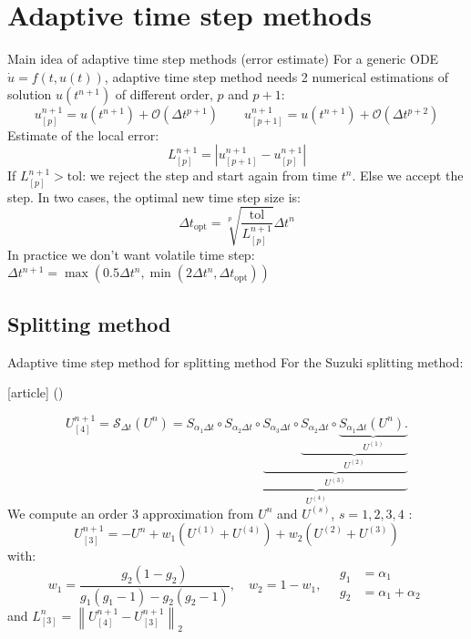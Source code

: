 \documentclass{beamer}
\newcommand{\customcite}[1]{\citeauthor{#1} (\citeyear{#1})}
\begin{document}
\section{Adaptive time step methods}
\begin{frame}{Main idea of adaptive time step methods (error estimate)}
  For a generic ODE $\dot{u} = f(t,u(t))$, adaptive time step method needs 2 numerical estimations of solution $u(t^{n+1})$ of different order, $p$ and $p+1$:
  $$
    u^{n+1}_{[p]} = u(t^{n+1}) + \mathcal{O}\left(\Delta t^{p+1}\right)
    \qquad
    u^{n+1}_{[p+1]} = u(t^{n+1}) + \mathcal{O}\left(\Delta t^{p+2}\right)
  $$
  Estimate of the local error:
  $$
    L^{n+1}_{[p]} = \left| u^{n+1}_{[p+1]} - u^{n+1}_{[p]} \right|
  $$
  If $L^{n+1}_{[p]} > \text{tol}$: we reject the step and  start again from time $t^n$. Else we accept the step. In two cases, the optimal new time step size is:
  $$
    \Delta t_\text{opt} = \sqrt[p]{\frac{\text{tol}}{ L^{n+1}_{[p]}}}\Delta t^n
  $$
  In practice we don't want volatile time step: $\Delta t^{n+1} = \max\left(0.5\Delta t^n,\min\left(2\Delta t^n,\Delta t_\text{opt}\right)\right)$
\end{frame}

\subsection{Splitting method}
\begin{frame}{Adaptive time step method for splitting method}
  For the Suzuki splitting method:
  \begin{thebibliography}{9}
    [article]
     \customcite{Blanes:2019}
  \end{thebibliography}
  $$
    U^{n+1}_{[4]} = \mathcal{S}_{\Delta t}(U^n)
      = S_{\alpha_1\Delta t}
        \circ \underbrace{ S_{\alpha_2\Delta t}
        \circ \underbrace{ S_{\alpha_3\Delta t}
        \circ \underbrace{ S_{\alpha_2\Delta t}
        \circ \underbrace{ S_{\alpha_1\Delta t} (U^n). }_{U^{(1)}}
                                                      }_{U^{(2)}}
                                                      }_{U^{(3)}}
                                                      }_{U^{(4)}}
  $$
  We compute an order 3 approximation from $U^n$ and $U^{(s)}$, $s=1,2,3,4$ :
  $$
    U^{n+1}_{[3]} = -U^n + w_1(U^{(1)}+U^{(4)}) + w_2(U^{(2)}+U^{(3)})
  $$
  with:
  $$
    w_1 = \frac{g_2(1-g_2)}{g_1(g_1-1)-g_2(g_2-1)},\quad w_2 = 1-w_1, \quad \begin{aligned}g_1 &= \alpha_1\\ g_2&=\alpha_1+\alpha_2\end{aligned}
  $$
  and $L^{n}_{[3]} = \left\| U^{n+1}_{[4]} - U^{n+1}_{[3]} \right\|_2$
\end{frame}
\end{document}
